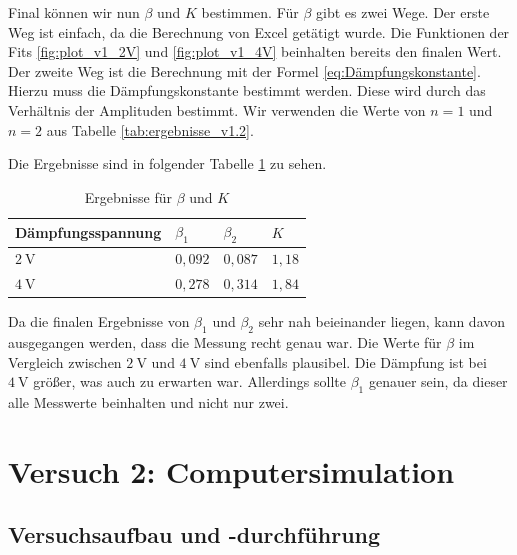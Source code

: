             Final können wir nun $\beta$ und $K$ bestimmen. Für $\beta$ gibt es zwei Wege. Der erste Weg ist einfach, da die Berechnung von Excel getätigt wurde. Die Funktionen der Fits \ref{fig:plot_v1_2V} und \ref{fig:plot_v1_4V} beinhalten bereits den finalen Wert. Der zweite Weg ist die Berechnung mit der Formel \ref{eq:Dämpfungskonstante}. Hierzu muss die Dämpfungskonstante bestimmt werden. Diese wird durch das Verhältnis der Amplituden bestimmt. Wir verwenden die Werte von $n = 1$ und $n = 2$ aus Tabelle \ref{tab:ergebnisse_v1.2}.

            Die Ergebnisse sind in folgender Tabelle \ref{tab:ergebnisse_v1.2_final} zu sehen.

            \begin{table}[H]
                \centering
                \caption{Ergebnisse für $\beta$ und $K$}
                \vspace{0.5em}
                \begin{tabular}{|l|l|l|l|}
                    \hline
                    Dämpfungsspannung & $\beta_{1}$& $\beta_{2}$ & $K$\\
                    \hline
                    \hline
                    $2\ \mathrm{V}$ & $0,092$ & $0,087$ & $1,18$\\
                    \hline
                    $4\ \mathrm{V}$ & $0,278$ & $0,314$ & $1,84$\\
                    \hline
                \end{tabular}
                \label{tab:ergebnisse_v1.2_final}
            \end{table}

            Da die finalen Ergebnisse von $\beta_{1}$ und $\beta_{2}$ sehr nah beieinander liegen, kann davon ausgegangen werden, dass die Messung recht genau war. Die Werte für $\beta$ im Vergleich zwischen $2\ \mathrm{V}$ und $4\ \mathrm{V}$ sind ebenfalls plausibel. Die Dämpfung ist bei $4\ \mathrm{V}$ größer, was auch zu erwarten war. Allerdings sollte $\beta_{1}$ genauer sein, da dieser alle Messwerte beinhalten und nicht nur zwei.


\section{Versuch 2: Computersimulation}

    \subsection{Versuchsaufbau und -durchführung}

